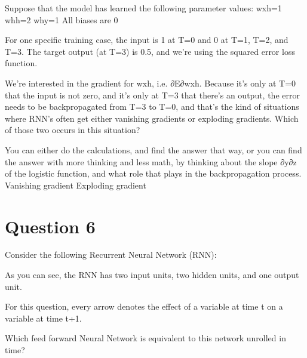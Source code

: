 Suppose that the model has learned the following parameter values:
wxh=1
whh=2
why=1
All biases are 0

For one specific training case, the input is 1 at T=0 and 0 at T=1, T=2, and T=3. The target output (at T=3) is 0.5, and we're using the squared error loss function.

We're interested in the gradient for wxh, i.e. ∂E∂wxh. Because it's only at T=0 that the input is not zero, and it's only at T=3 that there's an output, the error needs to be backpropagated from T=3 to T=0, and that's the kind of situations where RNN's often get either vanishing gradients or exploding gradients. Which of those two occurs in this situation?

You can either do the calculations, and find the answer that way, or you can find the answer with more thinking and less math, by thinking about the slope ∂y∂z of the logistic function, and what role that plays in the backpropagation process.
Vanishing gradient			
Exploding gradient			
\newpage
\section*{Question 6}
Consider the following Recurrent Neural Network (RNN): 

As you can see, the RNN has two input units, two hidden units, and one output unit.

For this question, every arrow denotes the effect of a variable at time t on a variable at time t+1.

Which feed forward Neural Network is equivalent to this network unrolled in time?
			
			
			
